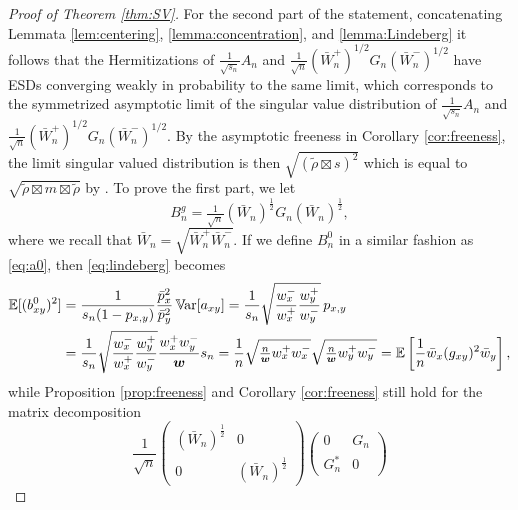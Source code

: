 \documentclass[11pt,oneside]{amsart}
\theoremstyle{plain}
\numberwithin{equation}{section}
\newcommand{\E}{\mathbb{E}}
\newcommand{\var}{\mathbb{V}\hspace{-1.pt}{\rm ar}}
\newcommand{\w}{\boldsymbol{w}}
\newcommand{\scaling}{s_n}
\begin{document}
\begin{proof}[Proof of Theorem \ref{thm:SV}]
    For the second part of the statement, concatenating Lemmata \ref{lem:centering}, \ref{lemma:concentration}, and \ref{lemma:Lindeberg} 
    it follows that the Hermitizations of
        $
        {\tfrac{1}{\sqrt{\scaling}}A_n}$ and $
       {\tfrac{1}{\sqrt{n}}(\bar{W}_n^+)^{1/2}G_n (\bar{W}_n^-)^{1/2}}$ have ESDs converging weakly in probability to the same limit, which corresponds to the symmetrized asymptotic limit of the singular value distribution of $
        {\tfrac{1}{\sqrt{\scaling}}A_n}$ and $
        {\tfrac{1}{\sqrt{n}}(\bar{W}_n^+)^{1/2}G_n (\bar{W}_n^-)^{1/2}}$.
        By the asymptotic freeness in Corollary \ref{cor:freeness}, the limit singular valued distribution is then $\sqrt{(\tilde \rho \boxtimes s)^2}$ which is equal to $\sqrt{\tilde \rho \boxtimes m \boxtimes\tilde \rho}$ by \cite[Lemma 8]{ArizmendiPerezAbreu}.
 To prove the first part, we let     \begin{equation}
    {B}_n^g=\tfrac{1}{\sqrt{n}}(\bar{W}_n)^{\frac12} G_n (\bar{W}_n)^{\frac12},
\end{equation}
where we recall that $\bar{W}_n = \sqrt{\bar{W}_n^+ \bar{W}_n^-}$. If we define $B_n^0$ in a similar fashion as \eqref{eq:a0}, then \eqref{eq:lindeberg} becomes
    \begin{equation}
    \begin{split}
        \E[(b^0_{xy})^2] 
        &=  \frac{1}{ {\scaling}(1-p_{x,y})}\frac{\bar p_x^2 }{\bar p_y^2}\,\var[a_{xy}]
        =  \frac{1}{ {\scaling}} \sqrt{\frac{w_x^-}{w_x^+} { \frac{w_y^+}{w_y^-}}}\,p_{x,y} \\ 
        &= \frac{1}{ {\scaling}}  \sqrt{\frac{w_x^-}{w_x^+} { \frac{w_y^+}{w_y^-}}} \frac{w_x^+w_y^- }{\w}\scaling
        =    \frac{1}{n}  \sqrt{\tfrac{n}{\w}{w_x^+}{w_x^-}} \sqrt{\tfrac{n}{\w}{w_y^+}{w_y^-}}
        =  \E\left[\frac 1n\bar w_x (g_{xy})^2\bar w_y\right],
    \end{split}
    \end{equation}
    while Proposition \ref{prop:freeness} and Corollary \ref{cor:freeness} still hold for the matrix decomposition
    \begin{equation}
    \frac{1}{\sqrt{n}}\begin{pmatrix} (\bar{W}_n)^{\frac12} & 0  \\ 0 & (\bar{W}_n)^{\frac12}  \end{pmatrix}
        \begin{pmatrix} 0 & G_n \\  G_n^*   & 0 \end{pmatrix}

\end{equation}
\end{proof}
\end{document}
